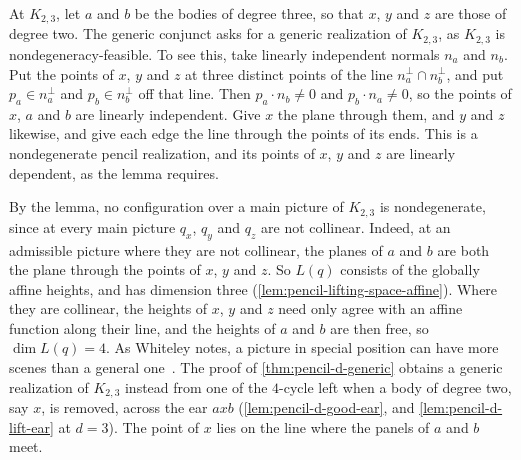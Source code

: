 At $K_{2,3}$, let $a$ and $b$ be the bodies of degree three, so that $x$,
$y$ and $z$ are those of degree two. The generic conjunct asks for a
generic realization of $K_{2,3}$, as $K_{2,3}$ is nondegeneracy-feasible.
To see this, take linearly independent normals $n_a$ and $n_b$. Put the
points of $x$, $y$ and $z$ at three distinct points of the line
$n_a^{\perp} \cap n_b^{\perp}$, and put $p_a \in n_a^{\perp}$ and
$p_b \in n_b^{\perp}$ off that line. Then $p_a \cdot n_b \neq 0$ and
$p_b \cdot n_a \neq 0$, so the points of $x$, $a$ and $b$ are linearly
independent. Give $x$ the plane through them, and $y$ and $z$ likewise,
and give each edge the line through the points of its ends. This is a
nondegenerate pencil realization, and its points of $x$, $y$ and $z$ are
linearly dependent, as the lemma requires.

By the lemma, no configuration over a main picture of $K_{2,3}$ is
nondegenerate, since at every main picture $q_x$, $q_y$ and $q_z$ are not
collinear. Indeed, at an admissible picture where they are not collinear,
the planes of $a$ and $b$ are both the plane through the points of $x$,
$y$ and $z$. So $L(q)$ consists of the globally affine heights, and has
dimension three (\cref{lem:pencil-lifting-space-affine}). Where they are
collinear, the heights of $x$, $y$ and $z$ need only agree with an affine
function along their line, and the heights of $a$ and $b$ are then free,
so $\dim L(q) = 4$. As Whiteley notes, a picture in special position can
have more scenes than a general one~\cite[pp.~273--274]{whiteley1984}.
The proof of \cref{thm:pencil-d-generic} obtains a
generic realization of $K_{2,3}$ instead from one of the $4$-cycle left
when a body of degree two, say $x$, is removed, across the ear $a x b$
(\cref{lem:pencil-d-good-ear}, and \cref{lem:pencil-d-lift-ear} at
$d = 3$). The point of $x$ lies on the line where the panels of $a$ and
$b$ meet.

